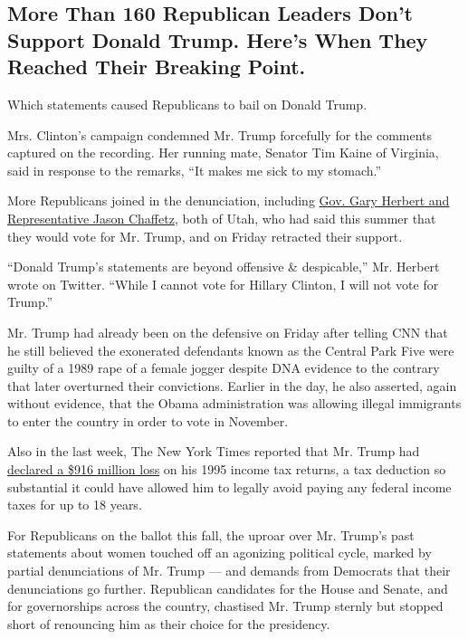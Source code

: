 \hypertarget{more-than-160-republican-leaders-dont-support-donald-trump-heres-when-they-reached-their-breaking-point}{%
\subsection{More Than 160 Republican Leaders Don't Support Donald Trump.
Here's When They Reached Their Breaking
Point.}\label{more-than-160-republican-leaders-dont-support-donald-trump-heres-when-they-reached-their-breaking-point}}

Which statements caused Republicans to bail on Donald Trump.

Mrs. Clinton's campaign condemned Mr. Trump forcefully for the comments
captured on the recording. Her running mate, Senator Tim Kaine of
Virginia, said in response to the remarks, ``It makes me sick to my
stomach.''

More Republicans joined in the denunciation, including
\href{http://www.nytimes3xbfgragh.onion/interactive/2016/08/29/us/politics/at-least-110-republican-leaders-wont-vote-for-donald-trump-heres-when-they-reached-their-breaking-point.html\#tape}{Gov.
Gary Herbert and Representative Jason Chaffetz}, both of Utah, who had
said this summer that they would vote for Mr. Trump, and on Friday
retracted their support.

``Donald Trump's statements are beyond offensive \& despicable,'' Mr.
Herbert wrote on Twitter. ``While I cannot vote for Hillary Clinton, I
will not vote for Trump.''

Mr. Trump had already been on the defensive on Friday after telling CNN
that he still believed the exonerated defendants known as the Central
Park Five were guilty of a 1989 rape of a female jogger despite DNA
evidence to the contrary that later overturned their convictions.
Earlier in the day, he also asserted, again without evidence, that the
Obama administration was allowing illegal immigrants to enter the
country in order to vote in November.

Also in the last week, The New York Times reported that Mr. Trump had
\href{http://www.nytimes3xbfgragh.onion/2016/10/02/us/politics/donald-trump-taxes.html}{declared
a \$916 million loss} on his 1995 income tax returns, a tax deduction so
substantial it could have allowed him to legally avoid paying any
federal income taxes for up to 18 years.

For Republicans on the ballot this fall, the uproar over Mr. Trump's
past statements about women touched off an agonizing political cycle,
marked by partial denunciations of Mr. Trump --- and demands from
Democrats that their denunciations go further. Republican candidates for
the House and Senate, and for governorships across the country,
chastised Mr. Trump sternly but stopped short of renouncing him as their
choice for the presidency.

